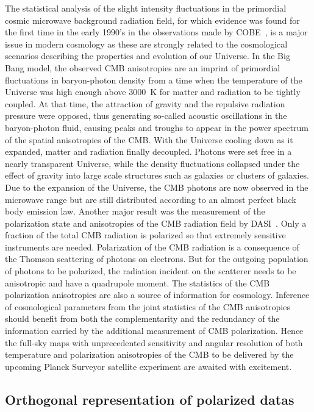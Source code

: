 The statistical analysis of the slight intensity fluctuations in the primordial cosmic microwave background radiation field, for which evidence was 
found for the first time in the early 1990's in the observations made by COBE~\cite{gauss:smoot92}, is a major issue in modern cosmology as these 
are strongly related to the cosmological scenarios describing the properties and evolution of our Universe. In the Big Bang model, the observed CMB 
anisotropies are an imprint of primordial fluctuations in baryon-photon density from a time when the temperature of the Universe was high enough above 
3000~K for matter and radiation to be tightly coupled. At that time, the attraction of gravity and the repulsive radiation pressure were opposed, thus 
generating so-called acoustic oscillations in the baryon-photon fluid, causing peaks and troughs to appear in the power spectrum of the spatial anisotropies 
of the CMB. With the Universe cooling down as it expanded, matter and radiation finally decoupled. Photons were set free in a nearly transparent Universe, 
while the density fluctuations collapsed under the effect of gravity into large scale structures such as galaxies or clusters of galaxies. Due to the 
expansion of the Universe, the CMB photons are now observed in the microwave range but are still distributed according to an almost perfect black body 
emission law. Another major result was the measurement of the polarization state and anisotropies of the CMB radiation field by DASI~\cite{dasi}. 
Only a fraction of the total CMB radiation is polarized so that extremely sensitive instruments are needed. Polarization of the CMB radiation is a 
consequence of the Thomson scattering of photons on electrons. But for the outgoing population of photons to be polarized, the radiation incident on 
the scatterer needs to be anisotropic and have a quadrupole moment. The statistics of the CMB polarization anisotropies are also a source of information 
for cosmology. Inference of cosmological parameters from the joint statistics of the CMB anisotropies should benefit from both the complementarity and 
the redundancy of the information carried by the additional measurement of CMB polarization. Hence the full-sky maps with unprecedented sensitivity and 
angular resolution of both temperature and polarization anisotropies of the CMB to be delivered by the upcoming Planck Surveyor satellite experiment are 
awaited with excitement.

\subsection{Orthogonal representation of polarized datas}
\label{sec:polar}

